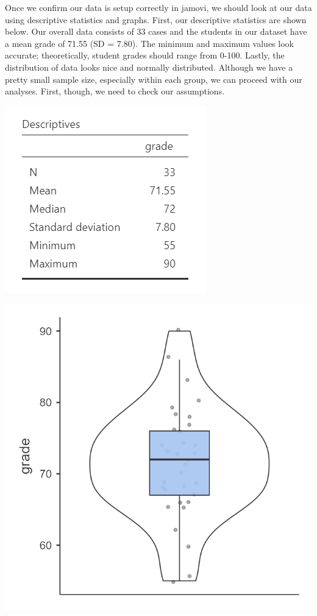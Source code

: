 \documentclass[
]{book}
\begin{document}
Once we confirm our data is setup correctly in jamovi, we should look at our data using descriptive statistics and graphs. First, our descriptive statistics are shown below. Our overall data consists of 33 cases and the students in our dataset have a mean grade of 71.55 (SD = 7.80). The minimum and maximum values look accurate; theoretically, student grades should range from 0-100. Lastly, the distribution of data looks nice and normally distributed. Although we have a pretty small sample size, especially within each group, we can proceed with our analyses. First, though, we need to check our assumptions.

\includegraphics{images/02-independent_t-test/independent_t-test_descriptives_all.png}

\includegraphics[width=5.5in,height=\textheight]{images/02-independent_t-test/independent_t-test_plot_all.png}
\end{document}
